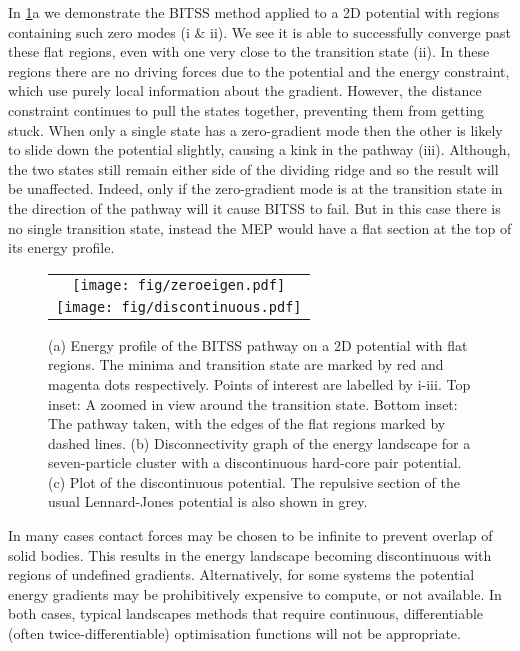\documentclass[aps,twocolumn]{revtex4-1}
\begin{document}
\topic In \cref{fig:flatdiscontinuous}a we demonstrate the BITSS method applied to a 2D potential with regions containing such zero modes (i \& ii).
We see it is able to successfully converge past these flat regions, even with one very close to the transition state (ii).
In these regions there are no driving forces due to the potential and the energy constraint, which use purely local information about the gradient.
However, the distance constraint continues to pull the states together, preventing them from getting stuck.
When only a single state has a zero-gradient mode then the other is likely to slide down the potential slightly, causing a kink in the pathway (iii).
Although, the two states still remain either side of the dividing ridge and so the result will be unaffected.
Indeed, only if the zero-gradient mode is at the transition state in the direction of the pathway will it cause BITSS to fail.
But in this case there is no single transition state, instead the MEP would have a flat section at the top of its energy profile.


\begin{figure}[htb]
  \centering
  \begin{tabular}[b]{c}
    \texttt{[image: fig/zeroeigen.pdf]}\\
    \texttt{[image: fig/discontinuous.pdf]}
  \end{tabular}
  \caption{
    (a) Energy profile of the BITSS pathway on a 2D potential with flat regions.
        The minima and transition state are marked by red and magenta dots respectively.
        Points of interest are labelled by i-iii.
        Top inset: A zoomed in view around the transition state.
        Bottom inset: The pathway taken, with the edges of the flat regions marked by dashed lines.
    (b) Disconnectivity graph of the energy landscape for a seven-particle cluster with a discontinuous hard-core pair potential.
    (c) Plot of the discontinuous potential.
        The repulsive section of the usual Lennard-Jones potential is also shown in grey.
  }
  \label{fig:flatdiscontinuous}
\end{figure}


\topic In many cases contact forces may be chosen to be infinite to prevent overlap of solid bodies.
This results in the energy landscape becoming discontinuous with regions of undefined gradients.
Alternatively, for some systems the potential energy gradients may be prohibitively expensive to compute, or not available.
In both cases, typical landscapes methods that require continuous, differentiable (often twice-differentiable) optimisation functions will not be appropriate.
\end{document}
